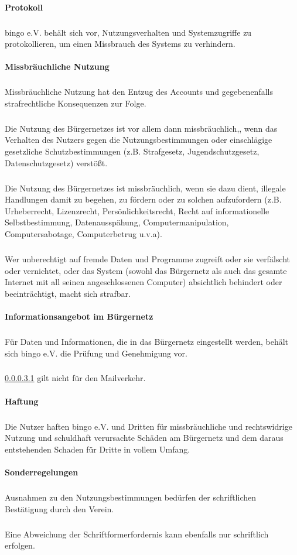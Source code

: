 \begin{multicols}{2}
\paragraph{Protokoll}
\subparagraph{} bingo e.V. behält sich vor, Nutzungsverhalten und Systemzugriffe zu
protokollieren, um einen Missbrauch des Systems zu verhindern.
\paragraph{Missbräuchliche Nutzung}
\subparagraph{} Missbräuchliche Nutzung hat den Entzug des Accounts und gegebenenfalls
strafrechtliche Konsequenzen zur Folge.
\subparagraph{} Die Nutzung des Bürgernetzes ist vor allem dann missbräuchlich,, wenn das
Verhalten des Nutzers gegen die Nutzungsbestimmungen oder einschlägige
gesetzliche Schutzbestimmungen (z.B. Strafgesetz, Jugendschutzgesetz,
Datenschutzgesetz) verstößt.
\subparagraph{} Die Nutzung des Bürgernetzes ist missbräuchlich, wenn sie dazu dient,
illegale Handlungen damit zu begehen, zu fördern oder zu solchen
aufzufordern (z.B. Urheberrecht, Lizenzrecht, Persönlichkeitsrecht, Recht auf
informationelle Selbstbestimmung, Datenausspähung,
Computermanipulation, Computersabotage, Computerbetrug u.v.a).
\subparagraph{} Wer unberechtigt auf fremde Daten und Programme zugreift oder sie
verfälscht oder vernichtet, oder das System (sowohl das Bürgernetz als auch
das gesamte Internet mit all seinen angeschlossenen Computer) absichtlich
behindert oder beeinträchtigt, macht sich strafbar.

\paragraph{Informationsangebot im Bürgernetz}
\subparagraph{} \label{subpar:pruefunggenehmigung} Für Daten und Informationen, die in das Bürgernetz eingestellt werden, behält
sich bingo e.V. die Prüfung und Genehmigung vor.
\subparagraph{} \ref{subpar:pruefunggenehmigung} gilt nicht für den Mailverkehr.

\paragraph{Haftung}
\subparagraph{} Die Nutzer haften bingo e.V. und Dritten für missbräuchliche und
rechtswidrige Nutzung und schuldhaft verursachte Schäden am Bürgernetz
und dem daraus entstehenden Schaden für Dritte in vollem Umfang.

\paragraph{Sonderregelungen}
\subparagraph{} Ausnahmen zu den Nutzungsbestimmungen bedürfen der schriftlichen
Bestätigung durch den Verein.
\subparagraph{} Eine Abweichung der Schriftformerfordernis kann ebenfalls nur schriftlich
erfolgen.


\end{multicols}
